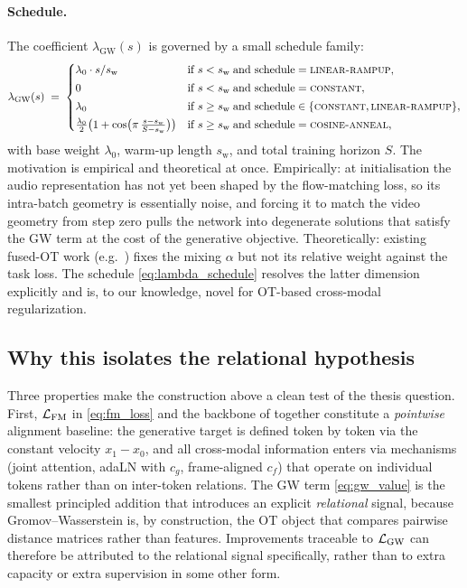 \paragraph{Schedule.}
The coefficient $\lambda_{\mathrm{GW}}(s)$ is governed by a small
schedule family:
\begin{equation}
  \lambda_{\mathrm{GW}}(s)
  \;=\;
  \begin{cases}
    \lambda_{0} \cdot s / s_{\mathrm{w}}
      & \text{if } s < s_{\mathrm{w}} \;\text{and schedule}=\textsc{linear-rampup}, \\[2pt]
    0
      & \text{if } s < s_{\mathrm{w}} \;\text{and schedule}=\textsc{constant}, \\[2pt]
    \lambda_{0}
      & \text{if } s \geq s_{\mathrm{w}} \;\text{and schedule}\in\{\textsc{constant}, \textsc{linear-rampup}\}, \\[2pt]
    \tfrac{\lambda_{0}}{2}\bigl(1 + \cos\bigl(\pi\,\tfrac{s - s_{\mathrm{w}}}{S - s_{\mathrm{w}}}\bigr)\bigr)
      & \text{if } s \geq s_{\mathrm{w}} \;\text{and schedule}=\textsc{cosine-anneal},
  \end{cases}
  \label{eq:lambda_schedule}
\end{equation}
with base weight $\lambda_{0}$, warm-up length $s_{\mathrm{w}}$,
and total training horizon $S$. The motivation is empirical and
theoretical at once. Empirically: at initialisation the audio
representation has not yet been shaped by the flow-matching loss,
so its intra-batch geometry is essentially noise, and forcing it
to match the video geometry from step zero pulls the network into
degenerate solutions that satisfy the GW term at the cost of the
generative objective. Theoretically: existing fused-OT work (e.g.\
\citet{chen_2020_graph}) fixes the mixing $\alpha$ but not its
relative weight against the task loss. The schedule
\eqref{eq:lambda_schedule} resolves the latter dimension explicitly
and is, to our knowledge, novel for OT-based cross-modal
regularization.

\subsection{Why this isolates the relational hypothesis}
\label{sec:methodology:isolation}

Three properties make the construction above a clean test of the
thesis question. First, $\mathcal{L}_{\mathrm{FM}}$ in \eqref{eq:fm_loss} and the
backbone of \citet{cheng_2025_mmaudio} together constitute a
\emph{pointwise} alignment baseline: the generative target is
defined token by token via the constant velocity $x_1 - x_0$, and
all cross-modal information enters via mechanisms (joint attention,
adaLN with $c_g$, frame-aligned $c_f$) that operate on individual
tokens rather than on inter-token relations. The GW term
\eqref{eq:gw_value} is the smallest principled addition that
introduces an explicit \emph{relational} signal, because
Gromov--Wasserstein is, by construction, the OT object that
compares pairwise distance matrices rather than features.
Improvements traceable to $\mathcal{L}_{\mathrm{GW}}$ can therefore be attributed to
the relational signal specifically, rather than to extra capacity
or extra supervision in some other form.

